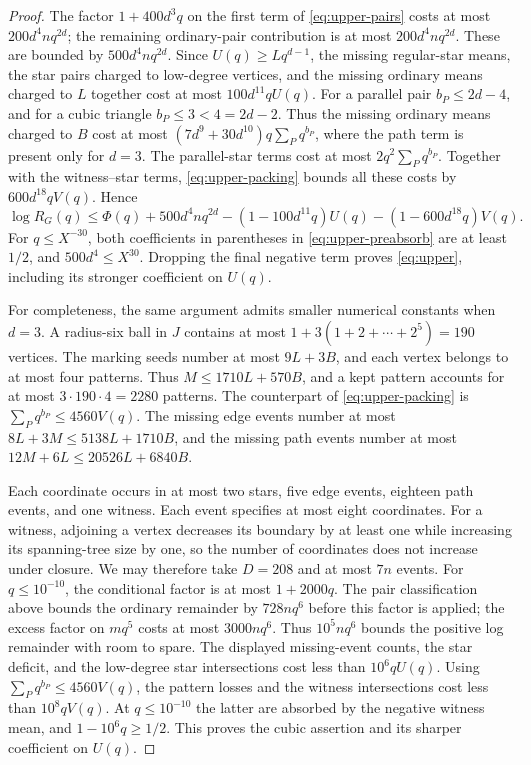 \documentclass[11pt,reqno]{amsart}
\theoremstyle{remark}
\numberwithin{equation}{section}
\begin{document}
\begin{proof}
The factor $1+400d^3q$ on the first term of
\eqref{eq:upper-pairs} costs at most $200d^4nq^{2d}$; the
remaining ordinary-pair contribution is at most
$200d^4nq^{2d}$. These are bounded by $500d^4nq^{2d}$.
Since $U(q)\ge Lq^{d-1}$, the missing regular-star means, the
star pairs charged to low-degree vertices, and the missing
ordinary means charged to $L$ together cost at most
$100d^{11}qU(q)$.
For a parallel pair $b_P\le2d-4$, and for a cubic triangle
$b_P\le3<4=2d-2$. Thus the missing ordinary means charged to
$B$ cost at most
$(7d^9+30d^{10})q\sum_Pq^{b_P}$, where the path term is
present only for $d=3$. The parallel-star terms cost at most
$2q^2\sum_Pq^{b_P}$. Together with the witness--star terms,
\eqref{eq:upper-packing} bounds all these costs by
$600d^{18}qV(q)$. Hence
\begin{equation}\label{eq:upper-preabsorb}
 \log R_G(q)\le
 \Phi(q)+500d^4nq^{2d}
 -(1-100d^{11}q)U(q)
 -(1-600d^{18}q)V(q).
\end{equation}
For $q\le X^{-30}$, both coefficients in parentheses in
\eqref{eq:upper-preabsorb} are at least $1/2$, and
$500d^4\le X^{30}$. Dropping the final
negative term proves \eqref{eq:upper}, including its stronger
coefficient on $U(q)$.

For completeness, the same argument admits smaller numerical
constants when $d=3$. A radius-six ball in $J$ contains at most
$1+3(1+2+\cdots+2^5)=190$ vertices. The marking seeds number
at most $9L+3B$, and each vertex belongs to at most four patterns.
Thus $M\le1710L+570B$, and a kept pattern accounts for at most
$3\cdot190\cdot4=2280$ patterns. The counterpart of
\eqref{eq:upper-packing} is $\sum_Pq^{b_P}\le4560V(q)$.
The missing edge events number at most
$8L+3M\le5138L+1710B$, and the missing path events number at
most $12M+6L\le20526L+6840B$.

Each coordinate occurs in at most two stars, five edge events,
eighteen path events, and one witness. Each event specifies at
most eight coordinates. For a witness, adjoining a vertex
decreases its boundary by at least one while increasing its
spanning-tree size by one, so the number of coordinates does not
increase under closure. We may therefore take $D=208$ and at
most $7n$ events. For $q\le10^{-10}$, the conditional factor
is at most $1+2000q$. The pair classification above bounds the
ordinary remainder by $728nq^6$ before this factor is applied;
the excess factor on $mq^5$ costs at most $3000nq^6$.
Thus $10^5nq^6$ bounds the positive log remainder with room to
spare. The displayed missing-event counts, the star deficit,
and the low-degree star intersections cost less than
$10^6qU(q)$. Using $\sum_Pq^{b_P}\le4560V(q)$, the
pattern losses and the witness intersections cost less than
$10^8qV(q)$. At $q\le10^{-10}$ the latter are absorbed by
the negative witness mean, and $1-10^6q\ge1/2$.
This proves the cubic assertion and its sharper coefficient on
$U(q)$.
\end{proof}
\end{document}
